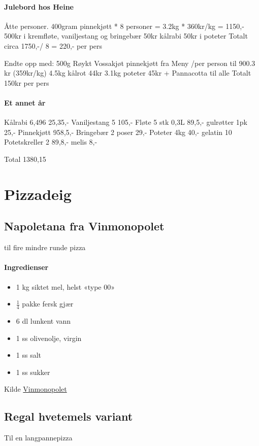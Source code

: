 \documentclass[12pt,a4paper]{book}
\begin{document}
\paragraph{Julebord hos Heine}
Åtte personer.
400gram pinnekjøtt * 8 personer = 3.2kg * 360kr/kg = 1150,-
500kr i kremfløte, vaniljestang og bringebær
50kr kålrabi
50kr i poteter
Totalt circa 1750,-/ 8 = 220,- per pers


Endte opp med:
500g Røykt Vossakjøt pinnekjøtt fra Meny /per person til 900.3 kr (359kr/kg)
4.5kg kålrot 44kr
3.1kg poteter 45kr
+ Pannacotta til alle
Totalt 150kr per pers


\paragraph{Et annet år}

Kålrabi 6,496 25,35,-
Vaniljestang 5 105,-
Fløte 5 stk 0,3L 89,5,-
gulrøtter 1pk 25,-
Pinnekjøtt 958,5,-
Bringebær 2 poser 29,-
Poteter 4kg 40,-
gelatin 10
Potetskreller 2 89,8,-
melis 8,-


Total
1380,15
\clearpage{}
\clearpage{}\section{﻿Pizzadeig}

\subsection{Napoletana fra Vinmonopolet}
til fire mindre runde pizza
\paragraph{Ingredienser}
\begin{itemize}[noitemsep]
	\item 1 kg siktet mel, helst «type 00»
	\item $\frac{1}{4}$  pakke fersk gjær
	\item 6 dl lunkent vann
	\item 1 ss olivenolje, virgin
	\item 1 ss salt
	\item 1 ss sukker
\end{itemize}


Kilde \href{http://www.vinmonopolet.no/artikkel/mat-og-drikke/kombinasjoner-med-mat/pizza/drikke-til-pizza}{Vinmonopolet}


\subsection{Regal hvetemels variant}
Til en langpannepizza
\end{document}
